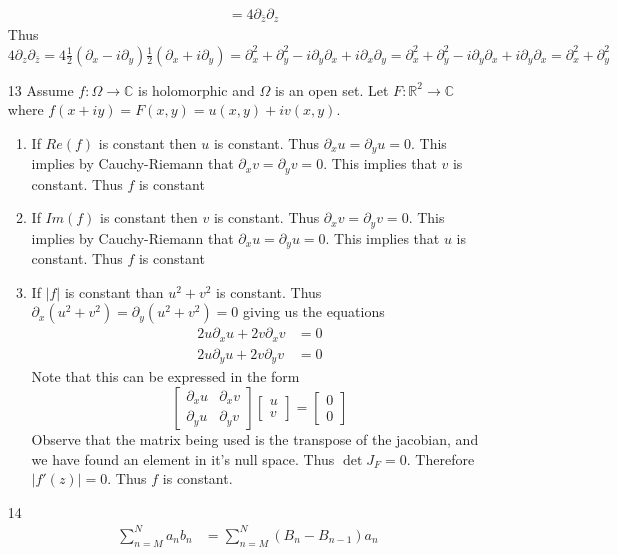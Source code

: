 \documentclass[12pt, letterpaper]{article}
\newcommand{\R}{\mathbb{R}}
\newcommand{\C}{\mathbb{C}}
\begin{document}
\begin{enumerate}
\begin{align*}
		&= 4 \partial_{\bar{z}} \partial_z
	\end{align*}
	Thus $4 \partial_z \partial_{\bar{z}} = 4 \frac{1}{2} (\partial_x - i \partial_y)\frac{1}{2}(\partial_x + i \partial_y) = \partial_x^2 + \partial_y^2 - i \partial_y \partial_x + i \partial_x \partial_y = \partial_x^2 + \partial_y^2 - i \partial_y \partial_x + i \partial_y \partial_x = \partial_x^2 + \partial_y^2$
	\item[13] Assume $f: \Omega \to \C$ is holomorphic and $\Omega$ is an open set.  Let $F:\R^2 \to \C$ where 
	$f(x+iy) = F(x,y) = u(x,y) + i v(x,y)$.
	\begin{enumerate}
		\item If $Re(f)$ is constant then $u$ is constant.  Thus $\partial_x u = \partial_y u = 0$.  This implies by 
		Cauchy-Riemann that $\partial_x v = \partial_y v = 0$.  This implies that $v$ is constant.  Thus $f$ is constant
		\item If $Im(f)$ is constant then $v$ is constant.  Thus $\partial_x v = \partial_y v = 0$.  This implies by 
		Cauchy-Riemann that $\partial_x u = \partial_y u = 0$.  This implies that $u$ is constant.  Thus $f$ is constant
		\item If $|f|$ is constant than $u^2 + v^2$ is constant.  Thus $\partial_x(u^2 + v^2) = \partial_y(u^2 + v^2) = 0$ giving us the equations 
		\begin{align*}
		2 u \partial_x u + 2 v \partial_x v &= 0\\
		2 u \partial_y u + 2 v \partial_y v &= 0
		\end{align*}
		Note that this can be expressed in the form 
$$		
		\begin{bmatrix}
		\partial_x u & \partial_x v\\
		\partial_y u & \partial_y v
		\end{bmatrix}
		\begin{bmatrix}
		u\\ v
		\end{bmatrix}
		= 
		\begin{bmatrix}
		0\\0
		\end{bmatrix}
$$
	Observe that the matrix being used is the transpose of the jacobian, and we have found an element in it's null space.
	Thus $\det J_F = 0$.  Therefore $|f'(z)| = 0$.  Thus $f$ is constant.  
	\end{enumerate}
	\item[14]
	\begin{align*}
		\sum_{n = M}^N a_n b_n &= \sum_{n = M}^N (B_{n} - B_{n-1}) a_n\\

\end{align*}
\end{enumerate}
\end{document}
